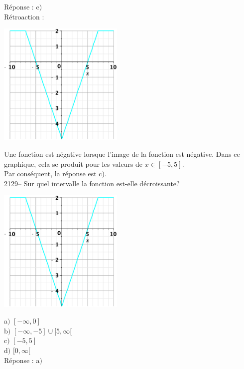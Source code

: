 \documentclass[letterpaper, 12pt]{article}
\begin{document}
R\'eponse : c$)$\\

R\'etroaction :\\
\begin{center}
 \includegraphics[width=6cm,bb=20 118 575 673]{Q2128.eps}
\end{center}
Une fonction est n\'egative lorsque l'image de la fonction est n\'egative. Dans ce graphique, cela se produit pour les valeurs de $x\in[-5,5]$.\\
Par cons\'equent, la r\'eponse est c).\\

2129-- Sur quel intervalle la fonction est-elle d\'ecroissante? \\
\begin{center}
 \includegraphics[width=6cm,bb=20 118 575 673]{Q2128.eps}
\end{center}

a$)$  $[-\infty,0]$\\
b$)$  $[-\infty,-5]\cup[5,\infty[$\\
c$)$  $[-5,5]$\\
d$)$  $[0,\infty[$\\

R\'eponse : a$)$\\
\end{document}
